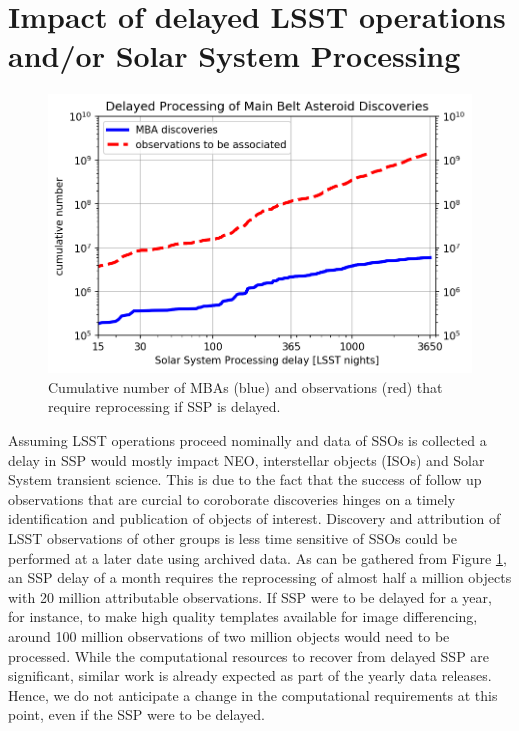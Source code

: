 \section{Impact of delayed \gls{LSST} operations and/or Solar System Processing} \label{sec:delay}
%
\begin{figure}[tb!]
\begin{center}
\includegraphics[width=0.70\linewidth]{figs/reprocessing4.png}
\caption{Cumulative number of MBAs (blue) and observations (red) that require reprocessing if \gls{SSP} is delayed. }
\end{center}
\label{fig:rep}       %
\end{figure}
Assuming \gls{LSST} operations proceed nominally and data of \gls{SSO}s is collected a delay in \gls{SSP} would mostly impact \gls{NEO}, interstellar objects (ISOs) and Solar System \gls{transient} science. This is due to the fact that the success of follow up observations that are curcial to coroborate discoveries hinges on a timely identification and publication of objects of interest.
Discovery and attribution of \gls{LSST} observations of other groups is less time sensitive of \gls{SSO}s could be performed at a later date using archived data.
As can be gathered from Figure \ref{fig:rep}, an \gls{SSP} delay of a month requires the reprocessing of almost half a million objects with 20 million attributable observations. If \gls{SSP} were to be delayed for a year, for instance, to make high quality templates available for image differencing, around 100 million observations of two million objects would need to be processed.
While the computational resources to recover from delayed \gls{SSP} are significant, similar work is already expected as part of the yearly data releases.
Hence, we do not anticipate a change in the computational requirements at this point, even if the \gls{SSP} were to be delayed.
%
